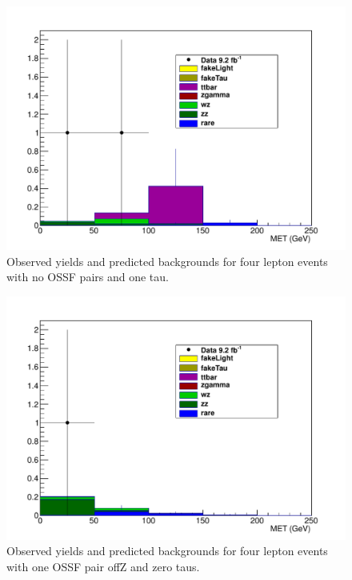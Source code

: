 \begin{figure}[htp]
\begin{center}
\includegraphics[width=1.0\textwidth]{plots/4L_MET_dist_offZ_ossf0_tau1_note.pdf}
\caption{Observed yields and predicted backgrounds for four lepton events with no OSSF pairs and one tau.}
\label{fig:L4OSSF0tau1}
\end{center}
\end{figure}

\begin{figure}[htp]
\begin{center}
\includegraphics[width=1.0\textwidth]{plots/4L_MET_dist_offZ_ossf1_tau0_note.pdf}
\caption{Observed yields and predicted backgrounds for four lepton events with one OSSF pair offZ and zero taus.}
\label{fig:L4OSSF1offZtau0}
\end{center}
\end{figure}

